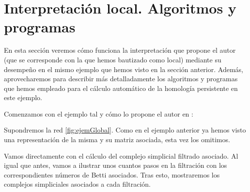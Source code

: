 \documentclass[12pt, a4paper, twoside]{book}
\numberwithin{equation}{section}
\theoremstyle{definition}
\newenvironment{ejem}
  {\pushQED{\qed}\renewcommand{\qedsymbol}{$\blacktriangleleft$}\ejemplo}
  {\popQED\endejemplo}
\theoremstyle{remark}
\theoremstyle{plain}
\begin{document}
	\section{Interpretación local. Algoritmos y programas}

	En esta sección veremos cómo funciona la interpretación que propone 
	el autor (que se corresponde con la que hemos bautizado como local) 
	mediante su desempeño en el mismo ejemplo que hemos visto en la 
	sección anterior. Además, aprovecharemos para describir más 
	detalladamente los algoritmos y programas que hemos empleado para el 
	cálculo automático de la homología persistente en este ejemplo.

	Comenzamos con el ejemplo tal y cómo lo propone el autor en 
	\cite{Articulo-Watanabe}:
	
	\begin{ejem}
		Supondremos la red \ref{fig:ejemGlobal}. Como en el ejemplo 
		anterior ya hemos visto una representación de la misma y su 
		matriz asociada, esta vez los omitimos.

		Vamos directamente con el cálculo del complejo simplicial 
		filtrado asociado. Al igual que antes, vamos a ilustrar unos 
		cuantos pasos en la filtración con los correspondientes 
		números de Betti asociados. Tras esto, mostraremos los 
		complejos simpliciales asociados a cada filtración.

		\begin{figure}[H]
\end{figure}
\end{ejem}
\end{document}
